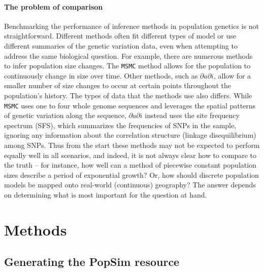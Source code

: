 \documentclass[12pt,halfline,a4paper]{ouparticle}
\newcommand{\dadi}{$\partial a \partial i$\xspace}
\newcommand{\MSMC}{\texttt{MSMC}\xspace}
\begin{document}
\paragraph{The problem of comparison} %
Benchmarking the performance of inference methods in population genetics is not straightforward.
Different methods often fit different types of model
or use different summaries of the genetic variation data, even when
attempting to address the same biological question. For example, there are
numerous methods to infer population size changes.
The \MSMC method \citep{schiffels2014inferring} allows for the
population to continuously change in size over time. Other methods, such as
\dadi \citep{gutenkunst2009inferring}, allow for a smaller number of size changes to occur at certain
points throughout the population's history. The types of data that the
methods use also differs. While \MSMC uses one to four whole genome sequences and leverages the
spatial patterns of genetic variation along the sequence, \dadi  instead uses the
site frequency spectrum (SFS), which summarizes the frequencies of SNPs in the
sample, ignoring any information about the correlation structure (linkage
disequilibrium) among SNPs. Thus from the start these methods may not be
expected to perform equally well in all scenarios,
and indeed, it is not always clear how to compare to the truth --
for instance, how well can a method of piecewise constant population sizes
describe a period of exponential growth?
Or, how should discrete population models be mapped onto real-world (continuous) geography?
The answer depends on determining what is most important for the question at hand.

\section*{Methods}
\subsection*{Generating the PopSim resource}
\end{document}

